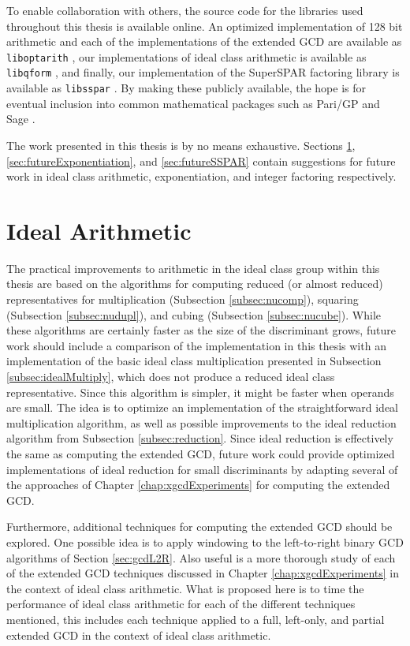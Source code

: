\documentclass{ucalgthes1}
\theoremstyle{definition}
\begin{document}
To enable collaboration with others, the source code for the libraries used throughout this thesis is available online.  An optimized implementation of 128 bit arithmetic and each of the implementations of the extended GCD are available as \texttt{liboptarith} \cite{liboptarith}, our implementations of ideal class arithmetic is available as \texttt{libqform} \cite{libqform}, and finally, our implementation of the SuperSPAR factoring library is available as \texttt{libsspar} \cite{libsspar}.   By making these publicly available, the hope is for eventual inclusion into common mathematical packages such as Pari/GP \cite{PariGP} and Sage \cite{Sage}.

The work presented in this thesis is by no means exhaustive.  Sections \ref{sec:futureIdealArithmetic}, \ref{sec:futureExponentiation}, and \ref{sec:futureSSPAR} contain suggestions for future work in ideal class arithmetic, exponentiation, and integer factoring respectively.

\section{Ideal Arithmetic}
\label{sec:futureIdealArithmetic}

The practical improvements to arithmetic in the ideal class group within this thesis are based on the algorithms for computing reduced (or almost reduced) representatives for multiplication (Subsection \ref{subsec:nucomp}), squaring (Subsection \ref{subsec:nudupl}), and cubing (Subsection \ref{subsec:nucube}).  While these algorithms are certainly faster as the size of the discriminant grows, future work should include a comparison of the implementation in this thesis with an implementation of the basic ideal class multiplication presented in Subsection \ref{subsec:idealMultiply}, which does not produce a reduced ideal class representative.  Since this algorithm is simpler, it might be faster when operands are small.  The idea is to optimize an implementation of the straightforward ideal multiplication algorithm, as well as possible improvements to the ideal reduction algorithm from Subsection \ref{subsec:reduction}.  Since ideal reduction is effectively the same as computing the extended GCD, future work could provide optimized implementations of ideal reduction for small discriminants by adapting several of the approaches of Chapter \ref{chap:xgcdExperiments} for computing the extended GCD.

Furthermore, additional techniques for computing the extended GCD should be explored.  One possible idea is to apply windowing to the left-to-right binary GCD algorithms of Section \ref{sec:gcdL2R}.  Also useful is a more thorough study of each of the extended GCD techniques discussed in Chapter \ref{chap:xgcdExperiments} in the context of ideal class arithmetic.  What is proposed here is to time the performance of ideal class arithmetic for each of the different techniques mentioned, this includes each technique applied to a full, left-only, and partial extended GCD in the context of ideal class arithmetic.
\end{document}
